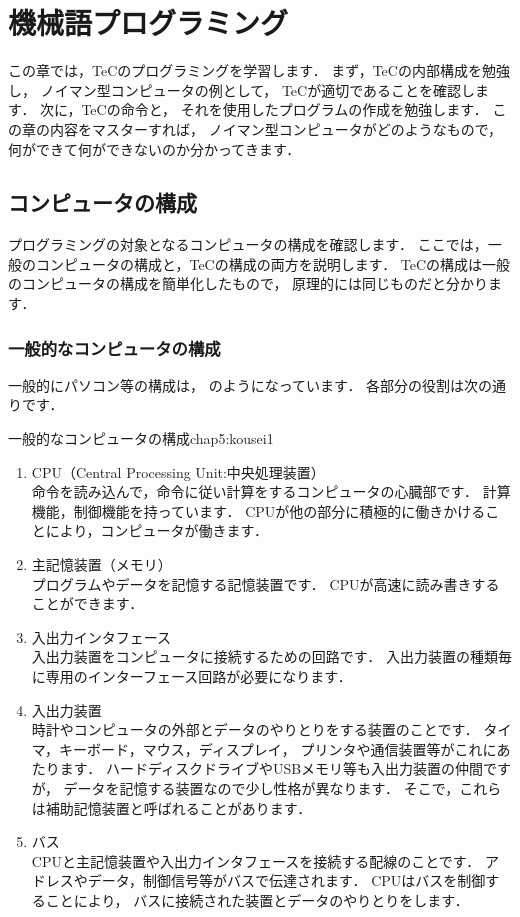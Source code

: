 \chapter{機械語プログラミング\label{prog1}}
この章では，TeCのプログラミングを学習します．
まず，TeCの内部構成を勉強し，
ノイマン型コンピュータの例として，
TeCが適切であることを確認します．
次に，TeCの命令と，
それを使用したプログラムの作成を勉強します．
この章の内容をマスターすれば，
ノイマン型コンピュータがどのようなもので，
何ができて何ができないのか分かってきます．

\section{コンピュータの構成}
プログラミングの対象となるコンピュータの構成を確認します．
ここでは，一般のコンピュータの構成と，TeCの構成の両方を説明します．
TeCの構成は一般のコンピュータの構成を簡単化したもので，
原理的には同じものだと分かります．

\subsection{一般的なコンピュータの構成}
一般的にパソコン等の構成は，
のようになっています．
各部分の役割は次の通りです．

          {一般的なコンピュータの構成}{chap5:kousei1}

\begin{enumerate}
\item CPU（Central Processing Unit:中央処理装置） \\
  命令を読み込んで，命令に従い計算をするコンピュータの心臓部です．
  計算機能，制御機能を持っています．
  CPUが他の部分に積極的に働きかけることにより，コンピュータが働きます．
\item 主記憶装置（メモリ） \\
  プログラムやデータを記憶する記憶装置です．
  CPUが高速に読み書きすることができます．
\item 入出力インタフェース \\
  入出力装置をコンピュータに接続するための回路です．
  入出力装置の種類毎に専用のインターフェース回路が必要になります．
\item 入出力装置 \\
  時計やコンピュータの外部とデータのやりとりをする装置のことです．
  タイマ，キーボード，マウス，ディスプレイ，
  プリンタや通信装置等がこれにあたります．
  ハードディスクドライブやUSBメモリ等も入出力装置の仲間ですが，
  データを記憶する装置なので少し性格が異なります．
  そこで，これらは補助記憶装置と呼ばれることがあります．
\item バス \\
  CPUと主記憶装置や入出力インタフェースを接続する配線のことです．
  アドレスやデータ，制御信号等がバスで伝達されます．
  CPUはバスを制御することにより，
  バスに接続された装置とデータのやりとりをします．
\end{enumerate}

